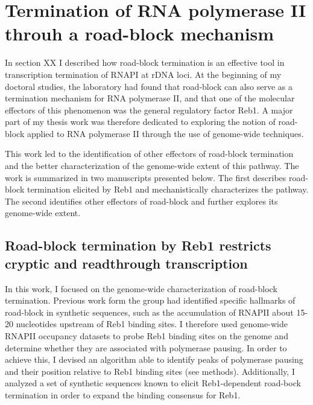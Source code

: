 \chapter{Termination of RNA polymerase II throuh a road-block mechanism}

In section XX I described how road-block termination is an effective tool in transcription termination of RNAPI at rDNA loci. 
At the beginning of my doctoral studies, the laboratory had found that road-block can also serve as a termination mechanism for RNA polymerase II, and that one of the molecular effectors of this phenomenon was the general regulatory factor Reb1. 
A major part of my thesis work was therefore dedicated to exploring the notion of road-block applied to RNA polymerase II through the use of genome-wide techniques.

This work led to the identification of other effectors of road-block termination and the better characterization of the genome-wide extent of this pathway. 
The work is summarized in two manuscripts presented below. 
The first describes road-block termination elicited by Reb1 and mechanistically characterizes the pathway.
The second identifies other effectors of road-block and further explores its genome-wide extent.

\section{Road-block termination by Reb1 restricts cryptic and readthrough transcription}

In this work, I focused on the genome-wide characterization of road-block termination. 
Previous work form the group had identified specific hallmarks of road-block in synthetic sequences, such as the accumulation of RNAPII about 15-20 nucleotides upstream of Reb1 binding sites. 
I therefore used genome-wide RNAPII occupancy datasets to probe Reb1 binding sites on the genome and determine whether they are associated with polymerase pausing. 
In order to achieve this, I devised an algorithm able to identify peaks of polymerase pausing and their position relative to Reb1 binding sites (see methods). 
Additionally, I analyzed a set of synthetic sequences known to elicit Reb1-dependent road-bock termination in order to expand the binding consensus for Reb1. 

\clearpage




\clearpage

